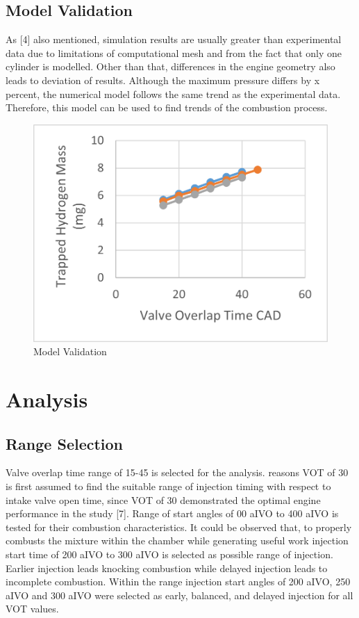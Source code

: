 \documentclass[conference]{IEEEtran}
\begin{document}
\subsection{Model Validation}
As [4] also mentioned, simulation results are usually greater than experimental data due to limitations of computational mesh and from the fact that only one cylinder is modelled. Other than that, differences in the engine geometry also leads to deviation of results.
Although the maximum pressure differs by x percent, the numerical model follows the same trend as the experimental data. Therefore, this model can be used to find trends of the combustion process.

\begin{figure}[htbp]
    \centerline{\includegraphics{Plots/trapped mass.png}}
    \caption{Model Validation}
    \label{plt_tt}
    \end{figure}
    
\section{Analysis}
\subsection{Range Selection}
Valve overlap time range of 15-45 is selected for the analysis. reasons
VOT of 30 is first assumed to find the suitable range of injection timing with respect to intake valve open time, since VOT of 30 demonstrated the optimal engine performance in the study [7].
Range of start angles of 00 aIVO to 400 aIVO is tested for their combustion characteristics. 
It could be observed that, to properly combusts the mixture within the chamber while generating useful work injection start time of 200 aIVO to 300 aIVO is selected as possible range of injection.
Earlier injection leads knocking combustion while delayed injection leads to incomplete combustion.
Within the range injection start angles of 200 aIVO, 250 aIVO and 300 aIVO were selected as early, balanced, and delayed injection for all VOT values.
\end{document}
